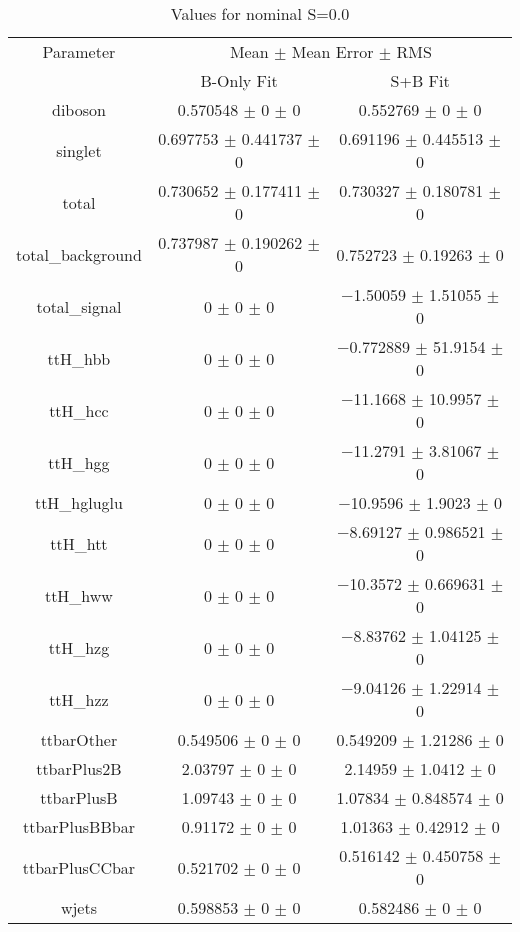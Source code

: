 \begin{table}
\centering
\caption{Values for nominal S=0.0}
\begin{tabular}{ccc}
\toprule
Parameter & \multicolumn{2}{c}{Mean $\pm$ Mean Error $\pm$ RMS}\\
 & B-Only Fit & S+B Fit\\
\midrule
diboson & \num{0.570548} $\pm$ \num{0} $\pm$ \num{0} & \num{0.552769} $\pm$ \num{0} $\pm$ \num{0}\\
singlet & \num{0.697753} $\pm$ \num{0.441737} $\pm$ \num{0} & \num{0.691196} $\pm$ \num{0.445513} $\pm$ \num{0}\\
total & \num{0.730652} $\pm$ \num{0.177411} $\pm$ \num{0} & \num{0.730327} $\pm$ \num{0.180781} $\pm$ \num{0}\\
total\_background & \num{0.737987} $\pm$ \num{0.190262} $\pm$ \num{0} & \num{0.752723} $\pm$ \num{0.19263} $\pm$ \num{0}\\
total\_signal & \num{0} $\pm$ \num{0} $\pm$ \num{0} & \num{-1.50059} $\pm$ \num{1.51055} $\pm$ \num{0}\\
ttH\_hbb & \num{0} $\pm$ \num{0} $\pm$ \num{0} & \num{-0.772889} $\pm$ \num{51.9154} $\pm$ \num{0}\\
ttH\_hcc & \num{0} $\pm$ \num{0} $\pm$ \num{0} & \num{-11.1668} $\pm$ \num{10.9957} $\pm$ \num{0}\\
ttH\_hgg & \num{0} $\pm$ \num{0} $\pm$ \num{0} & \num{-11.2791} $\pm$ \num{3.81067} $\pm$ \num{0}\\
ttH\_hgluglu & \num{0} $\pm$ \num{0} $\pm$ \num{0} & \num{-10.9596} $\pm$ \num{1.9023} $\pm$ \num{0}\\
ttH\_htt & \num{0} $\pm$ \num{0} $\pm$ \num{0} & \num{-8.69127} $\pm$ \num{0.986521} $\pm$ \num{0}\\
ttH\_hww & \num{0} $\pm$ \num{0} $\pm$ \num{0} & \num{-10.3572} $\pm$ \num{0.669631} $\pm$ \num{0}\\
ttH\_hzg & \num{0} $\pm$ \num{0} $\pm$ \num{0} & \num{-8.83762} $\pm$ \num{1.04125} $\pm$ \num{0}\\
ttH\_hzz & \num{0} $\pm$ \num{0} $\pm$ \num{0} & \num{-9.04126} $\pm$ \num{1.22914} $\pm$ \num{0}\\
ttbarOther & \num{0.549506} $\pm$ \num{0} $\pm$ \num{0} & \num{0.549209} $\pm$ \num{1.21286} $\pm$ \num{0}\\
ttbarPlus2B & \num{2.03797} $\pm$ \num{0} $\pm$ \num{0} & \num{2.14959} $\pm$ \num{1.0412} $\pm$ \num{0}\\
ttbarPlusB & \num{1.09743} $\pm$ \num{0} $\pm$ \num{0} & \num{1.07834} $\pm$ \num{0.848574} $\pm$ \num{0}\\
ttbarPlusBBbar & \num{0.91172} $\pm$ \num{0} $\pm$ \num{0} & \num{1.01363} $\pm$ \num{0.42912} $\pm$ \num{0}\\
ttbarPlusCCbar & \num{0.521702} $\pm$ \num{0} $\pm$ \num{0} & \num{0.516142} $\pm$ \num{0.450758} $\pm$ \num{0}\\
wjets & \num{0.598853} $\pm$ \num{0} $\pm$ \num{0} & \num{0.582486} $\pm$ \num{0} $\pm$ \num{0}\\
\bottomrule
\end{tabular}
\end{table}